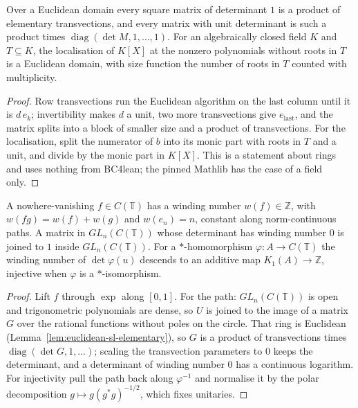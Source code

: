 \begin{lemma}\label{lem:euclidean-sl-elementary}
\leanok
Over a Euclidean domain every square matrix of determinant $1$ is a product
of elementary transvections, and every matrix with unit determinant is such a
product times $\operatorname{diag}(\det M,1,\dots,1)$. For an algebraically
closed field $K$ and $T\subseteq K$, the localisation of $K[X]$ at the nonzero
polynomials without roots in $T$ is a Euclidean domain, with size function
the number of roots in $T$ counted with multiplicity.
\end{lemma}
\begin{proof}
\leanok
Row transvections run the Euclidean algorithm on the last column until it is
$d\,e_k$; invertibility makes $d$ a unit, two more transvections give
$e_{\mathrm{last}}$, and the matrix splits into a block of smaller size
and a product of transvections. For the localisation, split the numerator of
$b$ into its monic part with roots in $T$ and a unit, and divide by the monic
part in $K[X]$. This is a statement about rings and uses nothing from
BC4lean; the pinned Mathlib has the case of a field only.
\end{proof}

\begin{lemma}\label{lem:circle-gl-winding}
\leanok
A nowhere-vanishing $f\in C(\mathbb T)$ has a winding number $w(f)\in\mathbb Z$, with
$w(fg)=w(f)+w(g)$ and $w(e_n)=n$, constant along norm-continuous paths. A matrix in $GL_n(C(\mathbb T))$ whose determinant has winding number
$0$ is joined to $1$ inside $GL_n(C(\mathbb T))$. For a $*$-homomorphism
$\varphi\colon A\to C(\mathbb T)$ the winding number of
$\det\varphi(u)$ descends to an additive map $K_1(A)\to\mathbb Z$, injective
when $\varphi$ is a $*$-isomorphism.
\end{lemma}
\begin{proof}
\leanok
Lift $f$ through $\exp$ along $[0,1]$. For the path: $GL_n(C(\mathbb T))$ is
open and trigonometric polynomials are dense, so $U$ is joined to the image of
a matrix $G$ over the rational functions without poles on the circle. That
ring is Euclidean (Lemma~\ref{lem:euclidean-sl-elementary}), so
$G$ is a product of transvections times $\operatorname{diag}(\det G,1,\dots)$;
scaling the transvection parameters to $0$ keeps the determinant, and a
determinant of winding number $0$ has a continuous logarithm. For injectivity
pull the path back along $\varphi^{-1}$ and normalise it by the polar
decomposition $g\mapsto g(g^*g)^{-1/2}$, which fixes unitaries.
\end{proof}


